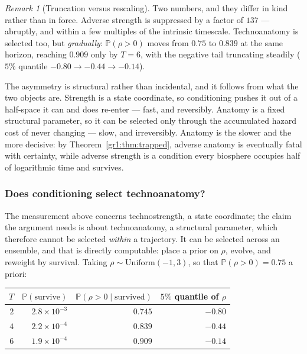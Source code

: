 \documentclass[11pt]{article}
\numberwithin{equation}{section}
\theoremstyle{plain}
\theoremstyle{definition}
\theoremstyle{remark}
\newtheorem{remark}[theorem]{Remark}
\newcommand{\PP}{\mathbb{P}}
\begin{document}
\begin{remark}[Truncation versus rescaling]\label{gr:rem:truncresc}
Two numbers, and they differ in kind rather than in force.
Adverse strength is suppressed by a factor of $137$ --- abruptly, and
within a few multiples of the intrinsic timescale. Technoanatomy is
selected too, but \emph{gradually}: $\PP(\rho>0)$ moves from $0.75$ to
$0.839$ at the same horizon, reaching $0.909$ only by $T=6$, with the
negative tail truncating steadily ($5\%$ quantile $-0.80\to-0.44\to
-0.14$).

The asymmetry is structural rather than incidental, and it follows from
what the two objects are. Strength is a state coordinate, so
conditioning pushes it out of a half-space it can and does re-enter ---
fast, and reversibly. Anatomy is a fixed structural parameter, so it can
be selected only through the accumulated hazard cost of never changing
--- slow, and irreversibly. Anatomy is the slower and the more decisive:
by Theorem~\ref{gr1:thm:trapped}, adverse anatomy is eventually fatal
with certainty, while adverse strength is a condition every biosphere
occupies half of logarithmic time and survives.

\end{remark}

\subsubsection{Does conditioning select technoanatomy?}
\label{gr:subsub:anatsel}

The measurement above concerns technostrength, a state coordinate; the
claim the argument needs is about technoanatomy, a structural parameter,
which therefore cannot be selected \emph{within} a trajectory. It can be
selected across an ensemble, and that is directly computable: place a
prior on $\rho$, evolve, and reweight by survival. Taking
$\rho\sim\mathrm{Uniform}(-1,3)$, so that $\PP(\rho>0)=0.75$ a priori:

\begin{center}\small
\begin{tabular}{@{}rrrr@{}}
\toprule
$T$ & $\PP(\text{survive})$ & $\PP(\rho>0\mid\text{survived})$ &
$5\%$ quantile of $\rho$\\
\midrule
$2$ & $2.8\times10^{-3}$ & $0.745$ & $-0.80$\\
$4$ & $2.2\times10^{-4}$ & $0.839$ & $-0.44$\\
$6$ & $1.9\times10^{-4}$ & $0.909$ & $-0.14$\\
\bottomrule
\end{tabular}
\end{center}
\end{document}
